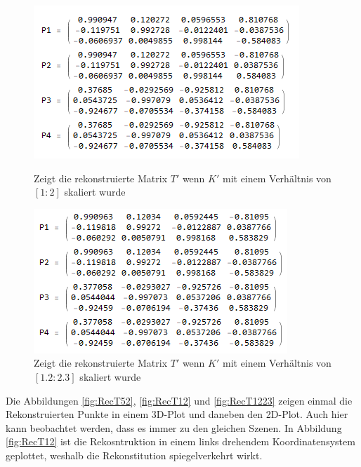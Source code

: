 \begin{figure}[!htb]
	\includegraphics[width=\linewidth]{images/R_12.png}
	\caption{Zeigt die rekonstruierte Matrix $T'$ wenn $K'$ mit einem Verhältnis von $[1:2]$ skaliert wurde}
	\label{fig:T12}
	\endminipage\hfill
	\includegraphics[width=\linewidth]{images/R_12_23.png}
	\caption{Zeigt die rekonstruierte Matrix $T'$ wenn $K'$ mit einem Verhältnis von $[1.2:2.3]$ skaliert wurde}
	\label{fig:T1223}
	\endminipage\hfill
\end{figure}
\pagebreak

Die Abbildungen \ref{fig:RecT52}, \ref{fig:RecT12} und \ref{fig:RecT1223} zeigen einmal die Rekonstruierten Punkte in einem 3D-Plot und daneben den 2D-Plot. Auch hier kann beobachtet werden, dass es immer zu den gleichen Szenen. In Abbildung \ref{fig:RecT12} ist die Rekosntruktion in einem links drehendem Koordinatensystem geplottet, weshalb die Rekonstitution spiegelverkehrt wirkt. 



